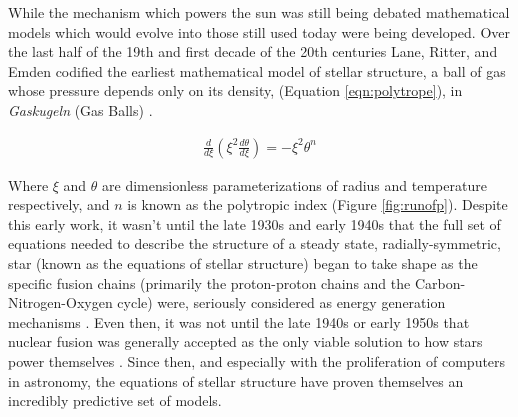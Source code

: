 While the mechanism which powers the sun was still being debated \citep[e.g][]{Cowling1935} mathematical
models which would evolve into those still used today were being developed.
Over the last half of the 19th and first decade of the 20th centuries Lane,
Ritter, and Emden codified the earliest mathematical model of stellar
structure, a ball of gas whose pressure depends only on its density, (Equation
\ref{eqn:polytrope}), in \textit{Gaskugeln} (Gas Balls) \citep{Emden1907}.

\begin{align}\label{eqn:polytrope}
	\frac{d}{d\xi}\left(\xi^{2}\frac{d\theta}{d\xi}\right) = -\xi^{2}\theta^{n}
\end{align}

Where $\xi$ and $\theta$ are dimensionless parameterizations of radius and
temperature respectively, and $n$ is known as the polytropic index (Figure
\ref{fig:runofp}). Despite this early work, it wasn't until the late 1930s and
early 1940s that the full set of equations needed to describe the structure of
a steady state, radially-symmetric, star (known as the equations of stellar
structure) began to take shape as the specific fusion chains (primarily the
proton-proton chains and the Carbon-Nitrogen-Oxygen cycle) were, seriously
considered as energy generation mechanisms \citep{Cowling1966}. Even then, it
was not until the late 1940s or early 1950s that nuclear fusion was generally
accepted as the only viable solution to how stars power themselves
\citep[e.g][]{Chandrasekhar1942}. Since then, and especially with the
proliferation of computers in astronomy, the equations of stellar structure
have proven themselves an incredibly predictive set of models.  

